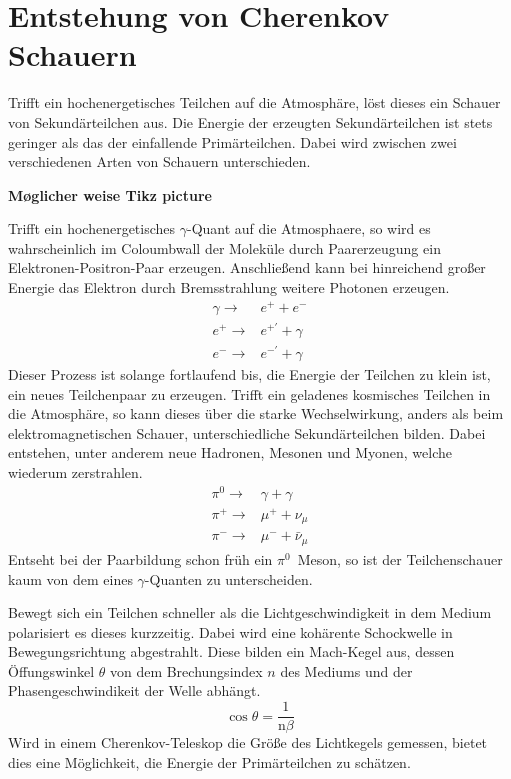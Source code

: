 \chapter{Entstehung von Cherenkov Schauern}
Trifft ein hochenergetisches Teilchen auf die Atmosphäre, löst dieses ein Schauer von Sekundärteilchen aus. Die Energie der erzeugten Sekundärteilchen ist stets geringer als das der einfallende Primärteilchen. Dabei wird zwischen zwei verschiedenen Arten von Schauern unterschieden. 

\textbf{Møglicher weise Tikz picture}

Trifft ein hochenergetisches $\gamma$-Quant auf die Atmosphaere, so wird es wahrscheinlich im Coloumbwall der Moleküle durch Paarerzeugung ein Elektronen-Positron-Paar erzeugen. 
Anschließend kann bei hinreichend großer Energie das Elektron durch Bremsstrahlung weitere Photonen erzeugen. 
\begin{eqnarray}
  \gamma \rightarrow& e^{+} + e^{-} \\
  e^{+} \rightarrow& e^{+'} + \gamma \\
  e^{-} \rightarrow& e^{-'} + \gamma 
\end{eqnarray}
Dieser Prozess ist solange fortlaufend bis, die Energie der Teilchen zu klein ist, ein neues Teilchenpaar zu erzeugen. 
Trifft ein geladenes kosmisches Teilchen in die Atmosphäre, so kann dieses über die starke Wechselwirkung, anders als beim elektromagnetischen Schauer, unterschiedliche Sekundärteilchen bilden. 
Dabei entstehen, unter anderem neue Hadronen, Mesonen und Myonen, welche wiederum zerstrahlen. 
\begin{eqnarray}
  \pi^{0} \rightarrow& \gamma + \gamma \\
  \pi^{+} \rightarrow& \mu^{+} + \nu_{\mu} \\
  \pi^{-} \rightarrow& \mu^{-} + \bar{\nu}_{\mu}
\end{eqnarray}
Entseht bei der Paarbildung schon früh ein $\pi^{0}$~Meson, so ist der Teilchenschauer kaum von dem eines $\gamma$-Quanten zu unterscheiden. 

Bewegt sich ein Teilchen schneller als die Lichtgeschwindigkeit in dem Medium polarisiert es dieses kurzzeitig. 
Dabei wird eine kohärente Schockwelle in Bewegungsrichtung abgestrahlt. Diese bilden ein Mach-Kegel aus, dessen Öffungswinkel $\theta$ von dem Brechungsindex $n$ des Mediums und der Phasengeschwindikeit der Welle abhängt.
\begin{equation}
  \cos  \theta = \frac{1}{\text{n} \beta}
\end{equation}
Wird in einem Cherenkov-Teleskop die Größe des Lichtkegels gemessen, bietet dies eine Möglichkeit, die Energie der Primärteilchen zu schätzen. 
